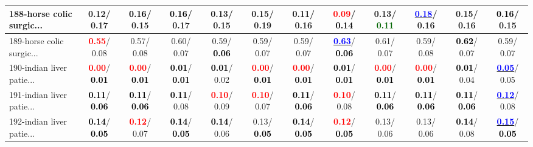 \begin{table}[h]
\begin{center}
{\begin{tabular}{lc|c|c|c|c|c|c|c|c|c|c}
188-horse colic surgic... &   0.12/  0.17 & \textcolor{black}{\textbf{  0.16}}/  0.15 & \textcolor{black}{\textbf{  0.16}}/  0.17 &   0.13/  0.15 &   0.15/  0.19 &   0.11/  0.16 & \textcolor{red}{\textbf{  0.09}}/\textcolor{black}{\textbf{  0.14}} &   0.13/\textcolor{darkgreen}{\textbf{  0.11}} & \underline{\textcolor{blue}{\textbf{  0.18}}}/  0.16 &   0.15/  0.16 & \textcolor{black}{\textbf{  0.16}}/  0.15 \\ \hline
189-horse colic surgic... & \textcolor{red}{\textbf{  0.55}}/  0.08 &   0.57/  0.08 &   0.60/  0.07 &   0.59/\textcolor{black}{\textbf{  0.06}} &   0.59/  0.07 &   0.59/  0.07 & \underline{\textcolor{blue}{\textbf{  0.63}}}/\textcolor{black}{\textbf{  0.06}} &   0.61/  0.07 &   0.59/  0.08 & \textcolor{black}{\textbf{  0.62}}/  0.07 &   0.59/  0.07 \\
190-indian liver patie... & \textcolor{red}{\textbf{  0.00}}/\textcolor{black}{\textbf{  0.01}} & \textcolor{red}{\textbf{  0.00}}/\textcolor{black}{\textbf{  0.01}} & \textcolor{black}{\textbf{  0.01}}/\textcolor{black}{\textbf{  0.01}} & \textcolor{black}{\textbf{  0.01}}/  0.02 & \textcolor{red}{\textbf{  0.00}}/\textcolor{black}{\textbf{  0.01}} & \textcolor{red}{\textbf{  0.00}}/\textcolor{black}{\textbf{  0.01}} & \textcolor{black}{\textbf{  0.01}}/\textcolor{black}{\textbf{  0.01}} & \textcolor{red}{\textbf{  0.00}}/\textcolor{black}{\textbf{  0.01}} & \textcolor{red}{\textbf{  0.00}}/\textcolor{black}{\textbf{  0.01}} & \textcolor{black}{\textbf{  0.01}}/  0.04 & \underline{\textcolor{blue}{\textbf{  0.05}}}/  0.05 \\
191-indian liver patie... & \textcolor{black}{\textbf{  0.11}}/\textcolor{black}{\textbf{  0.06}} & \textcolor{black}{\textbf{  0.11}}/\textcolor{black}{\textbf{  0.06}} & \textcolor{black}{\textbf{  0.11}}/  0.08 & \textcolor{red}{\textbf{  0.10}}/  0.09 & \textcolor{red}{\textbf{  0.10}}/  0.07 & \textcolor{black}{\textbf{  0.11}}/\textcolor{black}{\textbf{  0.06}} & \textcolor{red}{\textbf{  0.10}}/  0.08 & \textcolor{black}{\textbf{  0.11}}/\textcolor{black}{\textbf{  0.06}} & \textcolor{black}{\textbf{  0.11}}/\textcolor{black}{\textbf{  0.06}} & \textcolor{black}{\textbf{  0.11}}/\textcolor{black}{\textbf{  0.06}} & \underline{\textcolor{blue}{\textbf{  0.12}}}/  0.08 \\
192-indian liver patie... & \textcolor{black}{\textbf{  0.14}}/\textcolor{black}{\textbf{  0.05}} & \textcolor{red}{\textbf{  0.12}}/  0.07 & \textcolor{black}{\textbf{  0.14}}/\textcolor{black}{\textbf{  0.05}} & \textcolor{black}{\textbf{  0.14}}/  0.06 &   0.13/\textcolor{black}{\textbf{  0.05}} & \textcolor{black}{\textbf{  0.14}}/\textcolor{black}{\textbf{  0.05}} & \textcolor{red}{\textbf{  0.12}}/\textcolor{black}{\textbf{  0.05}} &   0.13/  0.06 &   0.13/  0.06 & \textcolor{black}{\textbf{  0.14}}/  0.08 & \underline{\textcolor{blue}{\textbf{  0.15}}}/\textcolor{black}{\textbf{  0.05}} \\\end{tabular}}\label{stratsALCKappa5AllReduxHalfa}
\end{center}
\end{table}
